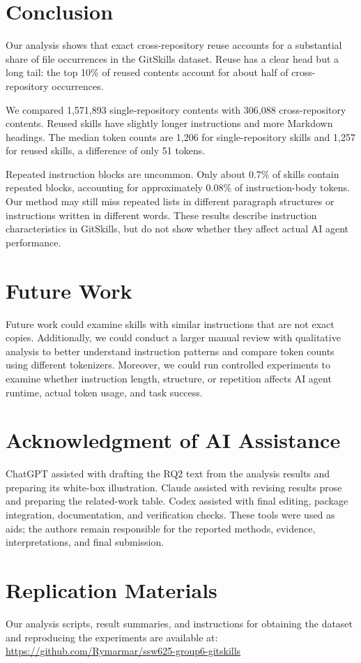 \documentclass[sigconf,review]{acmart}
\begin{document}
\section{Conclusion}
\label{Section:Conclusion}
Our analysis shows that exact cross-repository reuse accounts for a substantial share of file occurrences in the GitSkills dataset. Reuse has a clear head but a long tail: the top 10\% of reused contents account for about half of cross-repository occurrences.

We compared 1,571,893 single-repository contents with
306,088 cross-repository contents. Reused skills have
slightly longer instructions and more Markdown headings.
The median token counts are 1,206 for single-repository
skills and 1,257 for reused skills, a difference of only
51 tokens.

Repeated instruction blocks are uncommon. Only about
0.7\% of skills contain repeated blocks, accounting for
approximately 0.08\% of instruction-body tokens. Our
method may still miss repeated lists in different paragraph
structures or instructions written in different words.
These results describe instruction characteristics in
GitSkills, but do not show whether they affect actual
AI agent performance.

\section{Future Work}
\label{Section:FutureWork}
Future work could examine skills with similar instructions
that are not exact copies. Additionally, we could conduct
a larger manual review with qualitative analysis to better
understand instruction patterns and compare token counts
using different tokenizers. Moreover, we could run controlled
experiments to examine whether instruction length, structure,
or repetition affects AI agent runtime, actual token usage,
and task success.

\section*{Acknowledgment of AI Assistance}
ChatGPT assisted with drafting the RQ2 text from the analysis
results and preparing its white-box illustration. Claude assisted
with revising results prose and preparing the related-work table.
Codex assisted with final editing, package integration,
documentation, and verification checks. These tools were used
as aids; the authors remain responsible for the reported methods,
evidence, interpretations, and final submission.

\section*{Replication Materials}
Our analysis scripts, result summaries, and instructions
for obtaining the dataset and reproducing the experiments
are available at:
\url{https://github.com/Rymarmar/ssw625-group6-gitskills}

% 


\end{document}
